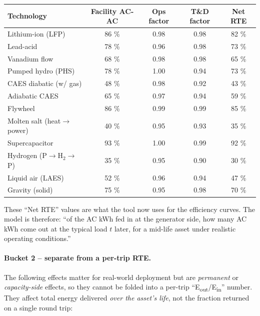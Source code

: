 \begin{footnotesize}
\begin{tabular}{|l|c|c|c|c|}
\hline
\textbf{Technology}         & \textbf{Facility AC-AC} & \textbf{Ops factor} & \textbf{T\&D factor} & \textbf{Net RTE} \\
\hline
Lithium-ion (LFP)           & 86 \% & 0.98 & 0.98 & 82 \% \\
Lead-acid                   & 78 \% & 0.96 & 0.98 & 73 \% \\
Vanadium flow               & 68 \% & 0.98 & 0.98 & 65 \% \\
Pumped hydro (PHS)          & 78 \% & 1.00 & 0.94 & 73 \% \\
CAES diabatic (w/ gas)      & 48 \% & 0.98 & 0.92 & 43 \% \\
Adiabatic CAES              & 65 \% & 0.97 & 0.94 & 59 \% \\
Flywheel                    & 86 \% & 0.99 & 0.99 & 85 \% \\
Molten salt (heat$\to$power)& 40 \% & 0.95 & 0.93 & 35 \% \\
Supercapacitor              & 93 \% & 1.00 & 0.99 & 92 \% \\
Hydrogen (P$\to$H$_2\to$P)  & 35 \% & 0.95 & 0.90 & 30 \% \\
Liquid air (LAES)           & 52 \% & 0.96 & 0.94 & 47 \% \\
Gravity (solid)             & 75 \% & 0.95 & 0.98 & 70 \% \\
\hline
\end{tabular}
\end{footnotesize}

These ``Net RTE'' values are what the tool now uses for the
efficiency curves. The model is therefore: ``of the AC kWh fed in
at the generator side, how many AC kWh come out at the typical load
$t$ later, for a mid-life asset under realistic operating
conditions.''

\paragraph{Bucket 2 -- separate from a per-trip RTE.}
The following effects matter for real-world deployment but are
\emph{permanent} or \emph{capacity-side} effects, so they cannot be
folded into a per-trip ``E\textsubscript{out}/E\textsubscript{in}''
number. They affect total energy delivered \emph{over the asset's
life}, not the fraction returned on a single round trip:

